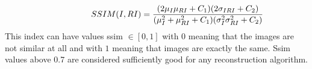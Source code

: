 \begin{equation} \label{eq:ssim2}
\centering
\hspace{3em} \hspace{3em} \hspace{3em} SSIM(I,RI)= \frac{(2\mu_{I} \mu_{RI} + C_1)(2\sigma_{IRI}+C_2)}{(\mu_{I}^2 + \mu_{RI}^2 + C_1)(\sigma_{I}^2 \sigma_{RI}^2 + C_2)}   \enspace \enspace \hspace{3em}
\end{equation}
This index can have values ssim $\in [0,1]$ with $0$ meaning that the images are not similar at all and with $1$ meaning that images are exactly the same. Ssim values above 0.7 are considered sufficiently good for any reconstruction algorithm.  

\FloatBarrier

    
 


  
